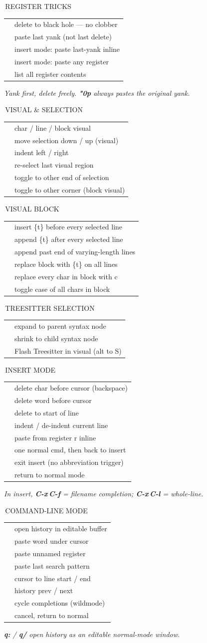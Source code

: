 \documentclass[9pt,a4paper,landscape]{extarticle}
\makeatletter
\newcommand{\kbd}[1]{{\ttfamily\bfseries\footnotesize\color{keyclr}#1}}
\newcommand{\sect}[1]{%
  \vspace{0.5pt}%
  {\setlength{\fboxsep}{1pt}%
   \noindent\colorbox{hdrbg}{\parbox{\dimexpr\columnwidth-2pt\relax}{%
     \color{hdrfg}\bfseries\sffamily\small\strut\,#1}}}%
  \par\vspace{0pt}}
\newlength{\kdsep}\setlength{\kdsep}{0pt}
\newcommand{\kd}[2]{\kbd{#1} & #2 \\[\kdsep]}
\newenvironment{kt}{%
  \setlength{\tabcolsep}{0pt}%
  \begin{tabular}{@{}>{\footnotesize\raggedright\arraybackslash}p{17mm}@{\hspace{2pt}}>{\footnotesize\color{bodyclr}\raggedright\arraybackslash}p{\dimexpr\columnwidth-17mm-2pt\relax}@{}}%
}{%
  \end{tabular}\par}
\newcommand{\snote}[1]{{\scriptsize\color{noteclr}\textit{#1}}\par}
\makeatother
\begin{document}
\begin{multicols}{5}
\sect{REGISTER TRICKS}
\begin{kt}
\kd{"\_d\{m\}}{delete to black hole — no clobber}
\kd{"0p}{paste last yank (not last delete)}
\kd{C-r\,0}{insert mode: paste last-yank inline}
\kd{C-r\,\{r\}}{insert mode: paste any register}
\kd{:reg}{list all register contents}
\end{kt}
\snote{Yank first, delete freely. \kbd{"0p} always pastes the original yank.}

\sect{VISUAL \& SELECTION}
\begin{kt}
\kd{v\,/\,V\,/\,C-v}{char / line / block visual}
\kd{J\,/\,K}{move selection down / up (visual)}
\kd{<\,/\,>}{indent left / right}
\kd{gv}{re-select last visual region}
\kd{o}{toggle to other end of selection}
\kd{O}{toggle to other corner (block visual)}
\end{kt}

\sect{VISUAL BLOCK}
\begin{kt}
\kd{I\{t\}\,Esc}{insert \{t\} before every selected line}
\kd{A\{t\}\,Esc}{append \{t\} after every selected line}
\kd{\$\,A\{t\}\,Esc}{append past end of varying-length lines}
\kd{c\{t\}\,Esc}{replace block with \{t\} on all lines}
\kd{r\{c\}}{replace every char in block with c}
\kd{\textasciitilde}{toggle case of all chars in block}
\end{kt}

\sect{TREESITTER SELECTION}
\begin{kt}
\kd{+}{expand to parent syntax node}
\kd{-}{shrink to child syntax node}
\kd{gS}{Flash Treesitter in visual (alt to S)}
\end{kt}

\sect{INSERT MODE}
\begin{kt}
\kd{C-h}{delete char before cursor (backspace)}
\kd{C-w}{delete word before cursor}
\kd{C-u}{delete to start of line}
\kd{C-t\,/\,C-d}{indent / de-indent current line}
\kd{C-r\,\{r\}}{paste from register r inline}
\kd{C-o}{one normal cmd, then back to insert}
\kd{C-c}{exit insert (no abbreviation trigger)}
\kd{Esc\,/\,C-{[}}{return to normal mode}
\end{kt}
\snote{In insert, \kbd{C-x\,C-f} = filename completion; \kbd{C-x\,C-l} = whole-line.}

\sect{COMMAND-LINE MODE}
\begin{kt}
\kd{C-f}{open history in editable buffer}
\kd{C-r\,C-w}{paste word under cursor}
\kd{C-r\,"}{paste unnamed register}
\kd{C-r\,/}{paste last search pattern}
\kd{C-b\,/\,C-e}{cursor to line start / end}
\kd{C-p\,/\,C-n}{history prev / next}
\kd{Tab}{cycle completions (wildmode)}
\kd{Esc}{cancel, return to normal}
\end{kt}
\snote{\kbd{q:} / \kbd{q/} open history as an editable normal-mode window.}


\end{multicols}
\end{document}
